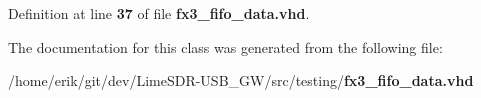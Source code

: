 Definition at line {\bf 37} of file {\bf fx3\+\_\+fifo\+\_\+data.\+vhd}.



The documentation for this class was generated from the following file\+:\begin{DoxyCompactItemize}
\item 
/home/erik/git/dev/\+Lime\+S\+D\+R-\/\+U\+S\+B\+\_\+\+G\+W/src/testing/{\bf fx3\+\_\+fifo\+\_\+data.\+vhd}\end{DoxyCompactItemize}
